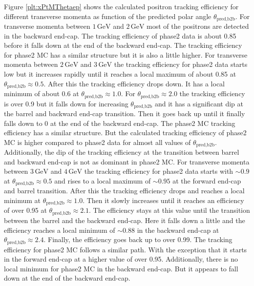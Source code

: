 \documentclass[a4paper,11pt,twosided,final,german,openbib,pdftex,listof=totoc,bibliography=totoc]{scrbook}
\begin{document}
Figure \ref{plt:xPtMThetaep} shows the calculated positron tracking efficiency for different transverse momenta as function of the predicted polar angle $\theta_{\textrm{pred,b2b}}$. For transverse momenta between $1\,\textrm{GeV}$ and $2\,\textrm{GeV}$ most of the positrons are detected in the backward end-cap. The tracking efficiency of phase2 data is about 0.85 before it falls down at the end of the backward end-cap. The tracking efficiency for phase2 MC has a similar structure but it is also a little higher.
For transverse momenta between $2\,\textrm{GeV}$ and $3\,\textrm{GeV}$ the tracking efficiency for phase2 data starts low  but it increases rapidly until it reaches a local maximum of about 0.85 at $\theta_{\textrm{pred,b2b}} \approx 0.5$. After this the tracking efficiency drops down. It has a local minimum of about 0.6 at $\theta_{\textrm{pred,b2b}} \approx 1.0$. For $\theta_{\textrm{pred,b2b}} \approx 2.0$ the tracking efficiency is over 0.9 but it falls down for increasing $\theta_{\textrm{pred,b2b}}$ and it has a significant dip at the barrel and backward end-cap transition. Then it goes back up until it finally falls down to 0 at the end of the backward end-cap. The phase2 MC tracking efficiency has a similar structure. But the calculated tracking efficiency of phase2 MC is higher compared to phase2 data for almost all values of $\theta_{\textrm{pred,b2b}}$. Additionally, the dip of the tracking efficiency at the transition between barrel and backward end-cap is not as dominant in phase2 MC.
For transverse momenta between $3\,\textrm{GeV}$ and $4\,\textrm{GeV}$ the tracking efficiency for phase2 data starts with $\sim 0.9$ at $\theta_{\textrm{pred,b2b}} \approx 0.5$ and rises to a local maximum of $\sim 0.95$ at the forward end-cap and barrel transition. After this the tracking efficiency drops and reaches a local minimum at $\theta_{\textrm{pred,b2b}} \approx 1.0$. Then it slowly increases until it reaches an efficiency of over 0.95 at $\theta_{\textrm{pred,b2b}} \approx 2.1$. The efficiency stays at this value until the transition between the barrel and the backward end-cap. Here it falls down a little and the efficiency reaches a local minimum of $\sim 0.88$ in the backward end-cap at $\theta_{\textrm{pred,b2b}} \approx 2.4$. Finally, the efficiency goes back up to over 0.99. The tracking efficiency for phase2 MC follows a similar path. With the exception that it starts in the forward end-cap at a higher value of over 0.95. Additionally, there is no local minimum for phase2 MC in the backward end-cap. But it appears to fall down at the end of the backward end-cap.
\end{document}
